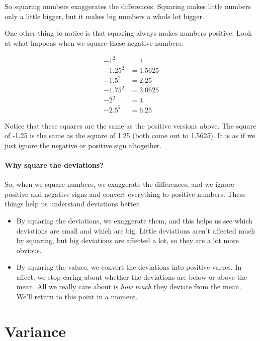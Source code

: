 \documentclass[../../../main.tex]{subfiles}
\begin{document}
So squaring numbers exaggerates the differences. Squaring makes little numbers only a little bigger, but it makes big numbers a whole lot bigger.

One other thing to notice is that squaring always makes numbers positive. Look at what happens when we square these negative numbers:

\begin{align*}
  -1^{2} &= 1 \\
  -1.25^{2} &= 1.5625 \\
  -1.5^{2} &= 2.25 \\
  -1.75^{2} &= 3.0625 \\
  -2^{2} &= 4 \\
  -2.5^{2} &= 6.25
\end{align*}

\noindent
Notice that these squares are the same as the positive versions above. The square of -1.25 is the same as the square of 1.25 (both come out to 1.5625). It is as if we just ignore the negative or positive sign altogether. 


\paragraph{Why square the deviations?}

So, when we square numbers, we exaggerate the differences, and we ignore positive and negative signs and convert everything to positive numbers. These things help us understand deviations better.

\begin{itemize}

  \item By squaring the deviations, we exaggerate them, and this helps us see which deviations are small and which are big. Little deviations aren't affected much by squaring, but big deviations are affected a lot, so they are a lot more obvious.

  \item By squaring the values, we convert the deviations into positive values. In affect, we stop caring about whether the deviations are below or above the mean. All we really care about is \emph{how much} they deviate from the mean. We'll return to this point in a moment.

\end{itemize}


\section{Variance}
\end{document}

